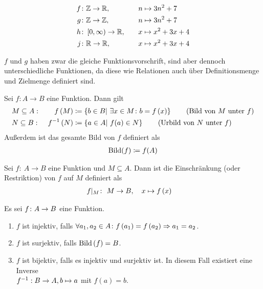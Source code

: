 \begin{beispiel}
    \theoremescape
    \begin{alignat*}{2}
        f\colon &\mathbb{Z} \rightarrow \mathbb{R},\quad && n\mapsto 3n^2+7\\
        g\colon &\mathbb{Z} \rightarrow \mathbb{Z},\quad && n\mapsto 3n^2+7\\
        h\colon &\left[0, \infty\right) \rightarrow \mathbb{R},\quad && x\mapsto x^2+3x+4\\
        j\colon &\mathbb{R} \rightarrow \mathbb{R},\quad && x\mapsto x^2+3x+4\\
    \end{alignat*}
\end{beispiel}
\begin{bemerkung}
    $f$ und $g$ haben zwar die gleiche Funktionsvorschrift, sind aber dennoch unterschiedliche Funktionen, da diese wie Relationen auch über Definitionsmenge und Zielmenge definiert sind.
\end{bemerkung}

\begin{notation}
    Sei $f: A\rightarrow B$ eine Funktion.
    Dann gilt
    \begin{alignat*}{2}
        & M \subseteq A:~ & f\left(M\right) &\coloneqq \left\{b\in B|~\exists x\in M\colon b=f\left(x\right)\right\}\tag{Bild von $M$ unter $f$}\\
        & N \subseteq B:~ & f^{-1}\left(N\right) &\coloneqq \left\{a\in A|~f(a)\in N\right\}\tag{Urbild von $N$ unter $f$}
    \end{alignat*}
    Außerdem ist das gesamte Bild von $f$ definiert als
    \begin{align*}
        \operatorname{Bild}(f) \coloneqq f(A)
    \end{align*}
\end{notation}
\begin{definition}
    Sei $f\colon~A \rightarrow B$ eine Funktion und $M \subseteq A$.
    Dann ist die Einschränkung (oder Restriktion) von $f$ auf $M$ definiert als
    \begin{align*}
        f|_{M}\colon&~M \rightarrow B,\quad x \mapsto f\left(x\right)
    \end{align*}
\end{definition}
\begin{definition}
    Es sei $f\colon A\rightarrow{} B$ eine Funktion.
    \theoremescape
    \begin{enumerate}[label=(\roman*)]
        \item $f$ ist injektiv, falls $\forall a_1, a_2 \in A\colon f\left(a_1\right) = f\left(a_2\right) \Rightarrow{} a_1 = a_2$.
        \item $f$ ist surjektiv, falls $\operatorname{Bild}\left(f\right) = B$.
        \item $f$ ist bijektiv, falls es injektiv und surjektiv ist. In diesem Fall existiert eine Inverse\\ $f^{-1}: B\rightarrow{} A, b\mapsto a$ mit $f(a)=b$.
    \end{enumerate}
\end{definition}

